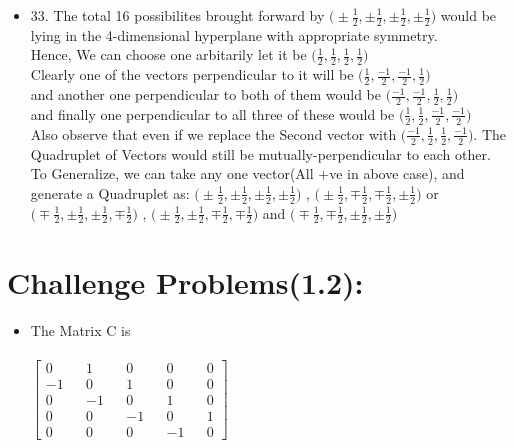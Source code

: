 \documentclass{article}
\begin{document}
\begin{itemize}
  \item 33. The total 16 possibilites brought forward by $\big(\pm \frac{1}{2}, \pm \frac{1}{2},\pm \frac{1}{2},\pm \frac{1}{2}\big)$ would be lying in the 4-dimensional hyperplane with appropriate symmetry. \\
  Hence, We can choose one arbitarily let it be $\big(\frac{1}{2},\frac{1}{2},\frac{1}{2},\frac{1}{2} \big)$ \\
  Clearly one of the vectors perpendicular to it will be $\big(\frac{1}{2},\frac{-1}{2},\frac{-1}{2},\frac{1}{2} \big)$ \\
  and another one perpendicular to both of them would be $\big(\frac{-1}{2},\frac{-1}{2},\frac{1}{2},\frac{1}{2} \big)$ \\
  and finally one perpendicular to all three of these would be $\big(\frac{1}{2},\frac{1}{2},\frac{-1}{2},\frac{-1}{2} \big)$\\
  Also observe that even if we replace the Second vector with $\big(\frac{-1}{2},\frac{1}{2},\frac{1}{2},\frac{-1}{2} \big)$. The Quadruplet of Vectors would still be mutually-perpendicular to each other.
  \\ To Generalize, we can take any one vector(All +ve in above case), and generate a Quadruplet as:
  $\big(\pm \frac{1}{2}, \pm \frac{1}{2},\pm \frac{1}{2},\pm \frac{1}{2}\big)$ , $\big(\pm \frac{1}{2}, \mp \frac{1}{2},\mp \frac{1}{2},\pm \frac{1}{2}\big)$ or $\big(\mp \frac{1}{2}, \pm \frac{1}{2},\pm \frac{1}{2},\mp \frac{1}{2}\big)$ , $\big(\pm \frac{1}{2}, \pm \frac{1}{2},\mp \frac{1}{2},\mp \frac{1}{2}\big)$ and $\big(\mp \frac{1}{2}, \mp \frac{1}{2},\pm \frac{1}{2},\pm \frac{1}{2}\big)$
\end{itemize}

\section{Challenge Problems(1.2):}
\begin{itemize}
  \item The Matrix C is \\ \\
  $\begin{bmatrix}
    0 && 1 && 0 && 0 && 0 \\
    -1 && 0 && 1 && 0 && 0 \\
    0 && -1 && 0 && 1 && 0 \\
    0 && 0 && -1 && 0 && 1 \\
    0 && 0 && 0 && -1 && 0

  \end{bmatrix}$
\end{itemize}
\end{document}
